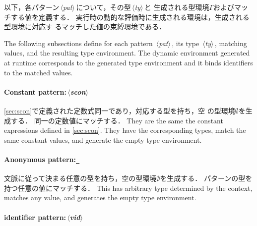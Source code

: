 \documentclass{jbook}
\newcommand{\txt}[2]{#2}
\newcommand{\nonterm}[1]{\mbox{$\,\langle$}{\it #1}\mbox{$\rangle\,$}}
\newcommand{\term}[1]{\mbox{{\tt #1}}}
\newcommand{\ass}{\Gamma}
\begin{document}
\ifjp%
	以下，各パターン\nonterm{pat}について，その型\nonterm{ty}と
生成される型環境$\ass$およびマッチする値を定義する．
	実行時の動的な評価時に生成される環境は，生成される型環境に対応す
るマッチした値の束縛環境である．

\else%
	The following subsections define for each pattern \nonterm{pat},
its type \nonterm{ty}, matching values, and the resulting type environment.
	The dynamic environment generated at runtime corresponds to 
the generated type environment and it binds identifiers to the matched
values.
\fi%

\paragraph{\txt{定数パターン}{Constant pattern}:\nonterm{scon}}

\ifjp%
	\ref{sec:scon}で定義された定数式同一であり，対応する型を持ち，空
の型環境$\emptyset$を生成する．
	同一の定数値にマッチする．
\else%
	They are the same the constant expressions defined in \ref{sec:scon}.
	They have the corresponding types, match the same constant
values, and generate the empty type environment.
\fi%

\paragraph{\txt{匿名パターン}{Anonymous pattern}:\term{\_}}

\ifjp%
	文脈に従って決まる任意の型を持ち，空の型環境$\emptyset$を生成する．
	パターンの型を持つ任意の値にマッチする．
\else%
	This has arbitrary type determined by the context, matches any value,
and generates the empty type environment.
\fi%

\paragraph{\txt{識別子パターン}{identifier pattern}:\nonterm{vid}}
\end{document}

